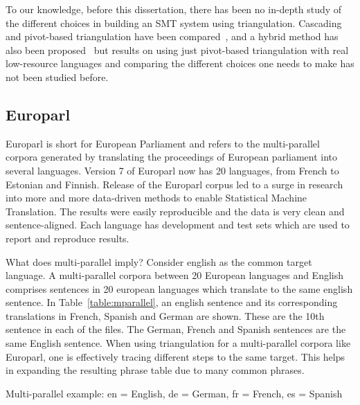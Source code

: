  To our knowledge, before this dissertation, there has been no in-depth study of the different choices in building an SMT system using triangulation. Cascading and pivot-based triangulation have been compared~\cite{Utiyama:07,Gispert:06}, and a hybrid method has also been proposed~\cite{Wu:09} but results on using just pivot-based triangulation with real low-resource languages and comparing the different choices one needs to make has not been studied before. 
\subsection{Europarl}
Europarl is short for European Parliament and refers to the multi-parallel corpora generated by translating the proceedings of European parliament into several languages. Version 7 of Europarl now has 20 languages, from French to Estonian and Finnish. Release of the Europarl corpus led to a surge in research into more and more data-driven methods to enable Statistical Machine Translation. The results were easily reproducible and the data is very clean and sentence-aligned. Each language has development and test sets which are used to report and reproduce results. 

What does multi-parallel imply? Consider english as the common target language. A multi-parallel corpora between 20 European languages and English comprises sentences in 20 european languages which translate to the same english sentence. In Table~\ref{table:mparallel}, an english sentence and its corresponding translations in French, Spanish and German are shown. These are the 10th sentence in each of the files. The German, French and Spanish sentences are the same English sentence. When using triangulation for a multi-parallel corpora like Europarl, one is effectively tracing different steps to the same target. This helps in expanding the resulting phrase table due to many common phrases. 

\begin{table*}
	\small
	\centering
	\small
	
	\caption{Multi-parallel example: en = English, de = German, fr = French, es = Spanish}
	\label{table:mparallel}
\end{table*}

